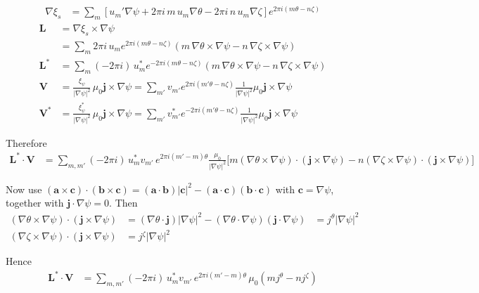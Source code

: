 \documentclass[10pt,a4paper]{article}
\numberwithin{equation}{section}
\begin{document}
\begin{align}
\nabla \xi_s
&=\sum_m
\left[
u_m' \nabla\psi
+
2\pi i\,m\,u_m \nabla\theta
-
2\pi i\,n\,u_m \nabla\zeta
\right]e^{2\pi i(m\theta-n\zeta)}
\end{align}
\begin{align}
\mathbf L
&=
\nabla\xi_s\times\nabla\psi \\
&=
\sum_m
2\pi i\,u_m e^{2\pi i(m\theta-n\zeta)}
\left(
m\,\nabla\theta\times\nabla\psi
-
n\,\nabla\zeta\times\nabla\psi
\right)\\
\mathbf L^*
&=
\sum_m
(-2\pi i)\,u_m^* e^{-2\pi i(m\theta-n\zeta)}
\left(
m\,\nabla\theta\times\nabla\psi
-
n\,\nabla\zeta\times\nabla\psi
\right) \\
\mathbf V
&=
\frac{\xi_\psi}{|\nabla\psi|^2}\,\mu_0\mathbf j\times\nabla\psi
=
\sum_{m'}
v_{m'} e^{2\pi i(m'\theta-n\zeta)}
\frac{1}{|\nabla\psi|^2}
\mu_0\mathbf j\times\nabla\psi\\
\mathbf V^*
&=
\frac{\xi_\psi^*}{|\nabla\psi|^2}\,\mu_0\mathbf j\times\nabla\psi
=
\sum_{m'}
v_{m'}^* e^{-2\pi i(m'\theta-n\zeta)}
\frac{1}{|\nabla\psi|^2}
\mu_0\mathbf j\times\nabla\psi
\end{align}

Therefore
\begin{align}
\mathbf L^*\cdot \mathbf V
&=
\sum_{m,m'}
(-2\pi i)\,
u_m^* v_{m'}\,
e^{2\pi i(m'-m)\theta}
\frac{\mu_0}{|\nabla\psi|^2}
\Big[
m(\nabla\theta\times\nabla\psi)\cdot(\mathbf j\times\nabla\psi)
-
n(\nabla\zeta\times\nabla\psi)\cdot(\mathbf j\times\nabla\psi)
\Big]
\end{align}

Now use
$(\mathbf a\times\mathbf c)\cdot(\mathbf b\times\mathbf c)=(\mathbf a\cdot\mathbf b)|\mathbf c|^2-(\mathbf a\cdot\mathbf c)(\mathbf b\cdot\mathbf c)$
with $\mathbf c=\nabla\psi$, together with $\mathbf j\cdot\nabla\psi=0$. Then
\begin{align}
(\nabla\theta\times\nabla\psi)\cdot(\mathbf j\times\nabla\psi)
&=(\nabla\theta\cdot\mathbf j)|\nabla\psi|^2-(\nabla\theta\cdot\nabla\psi)(\mathbf j\cdot\nabla\psi) &=j^\theta |\nabla\psi|^2\\
(\nabla\zeta\times\nabla\psi)\cdot(\mathbf j\times\nabla\psi)&=j^\zeta |\nabla\psi|^2
\label{eq:Vtriple}
\end{align}

Hence
\begin{align}
\mathbf L^*\cdot \mathbf V
&=
\sum_{m,m'}
(-2\pi i)\,
u_m^* v_{m'}\,
e^{2\pi i(m'-m)\theta}\,
\mu_0\left(mj^\theta-nj^\zeta\right)
\end{align}
\end{document}
